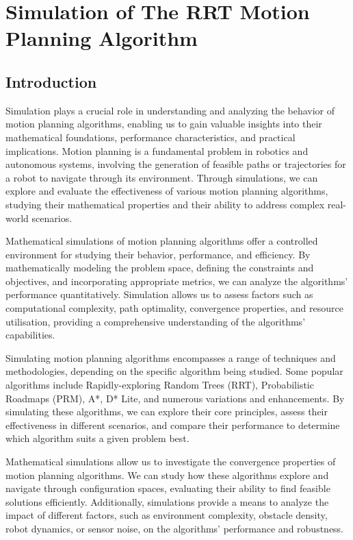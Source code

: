 \chapter{Simulation of The RRT Motion Planning Algorithm}

\section{Introduction}
Simulation plays a crucial role in understanding and analyzing the behavior of motion planning algorithms, enabling us to gain valuable insights into their mathematical foundations, performance characteristics, and practical implications.
Motion planning is a fundamental problem in robotics and autonomous systems, involving the generation of feasible paths or trajectories for a robot to navigate through its environment.
Through simulations, we can explore and evaluate the effectiveness of various motion planning algorithms, studying their mathematical properties and their ability to address complex real-world scenarios.

Mathematical simulations of motion planning algorithms offer a controlled environment for studying their behavior, performance, and efficiency. By mathematically modeling the problem space, defining the constraints and objectives, and incorporating appropriate metrics, we can analyze the algorithms' performance quantitatively.
Simulation allows us to assess factors such as computational complexity, path optimality, convergence properties, and resource utilisation, providing a comprehensive understanding of the algorithms' capabilities.

Simulating motion planning algorithms encompasses a range of techniques and methodologies, depending on the specific algorithm being studied.
Some popular algorithms include Rapidly-exploring Random Trees (RRT), Probabilistic Roadmaps (PRM), A*, D* Lite, and numerous variations and enhancements.
By simulating these algorithms, we can explore their core principles, assess their effectiveness in different scenarios, and compare their performance to determine which algorithm suits a given problem best.

Mathematical simulations allow us to investigate the convergence properties of motion planning algorithms.
We can study how these algorithms explore and navigate through configuration spaces, evaluating their ability to find feasible solutions efficiently.
Additionally, simulations provide a means to analyze the impact of different factors, such as environment complexity, obstacle density, robot dynamics, or sensor noise, on the algorithms' performance and robustness.

